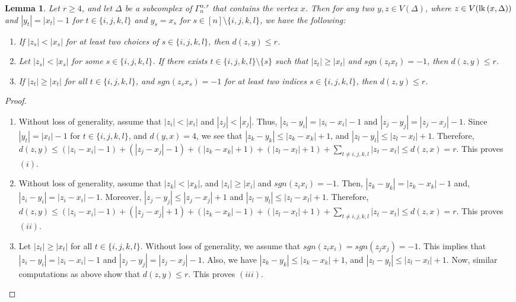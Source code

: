 \documentclass{amsart}
\newtheorem{lemma}[theorem]{Lemma}
\theoremstyle{definition}
\theoremstyle{remark}
\numberwithin{equation}{section}
\newcommand{\lk}{\mbox{\upshape lk}\,}
\newcommand{\D}{\Delta}
\begin{document}
\begin{lemma}\label{fourvertex}
	Let $r\geq 4$, and let  $\D$ be  a subcomplex of $\Gamma_n^{\alpha, r}$ that contains the vertex $x$. Then for any two $y, z \in V(\D)$, where $z\in V(\lk(x,\D))$ and  $|y_t|=|x_t|-1$ for $t\in\{i,j,k,l\}$ and $y_s=x_s$ for $s\in [n]\setminus\{i,j,k,l\}$, we have the following: 
	\begin{enumerate}[label=(\roman*)]
		\item If $|z_s|<|x_s|$ for at least two choices of $s\in\{i,j,k,l\}$,  then $d(z,y)\leq r$. 
		\item Let $|z_s|<|x_s|$ for some $s \in \{i, j, k, l\}$. If there exists $t \in \{i, j, k, l\} \setminus \{s\}$ such that $|z_t|\geq |x_t|$ and $sgn(z_tx_t)=-1$, then $d(z,y)\leq  r$. 
		\item If $|z_t|\geq |x_t|$ for all $t\in\{i,j,k,l\}$, and  $sgn(z_sx_s)=-1$  for at least two indices $s\in\{i,j,k,l\}$, then $d(z,y)\leq r$.
	\end{enumerate}
	
\end{lemma}

\begin{proof} 
	
	\begin{enumerate}[label=(\roman*)]
		\item Without loss of generality, assume that $|z_i|<|x_i|$ and $|z_j|<|x_j|$. Thus,
		$|z_i - y_i| = |z_i - x_i| - 1$ and  $|z_j - y_j| = |z_j - x_j| - 1$. 
		Since $|y_t|=|x_t|-1$ for $t\in\{i,j,k,l\}$, and $d(y,x)=4$, we see that $|z_k-y_k|\leq |z_k-x_k|+1$, and $|z_l-y_l|\leq |z_l-x_l|+1$. Therefore, $d(z,y)\leq (|z_i - x_i| - 1) + (|z_j - x_j| - 1) + (|z_k-x_k|+1)+ (|z_l-x_l|+1)+\sum_{t \neq i,j,k,l} |z_t - x_t| \leq d(z,x)=r$. This proves $(i).$
		
		\item Without loss of generality, assume that $|z_k| < |x_k|$, and $|z_i| \geq |x_i|$ and $sgn(z_ix_i)=-1$. Then, $|z_k - y_k| = |z_k - x_k| - 1$ and, $|z_i - y_i| = |z_i - x_i| - 1$. Moreover, $|z_j - y_j| \leq |z_j - x_j| + 1$ and $|z_l - y_l| \leq |z_l - x_l| + 1$. Therefore, $d(z, y) \leq (|z_i - x_i| - 1) + (|z_j - x_j| + 1) + (|z_k - x_k| - 1) + (|z_l - x_l| + 1) + \sum_{t \neq i,j,k,l} |z_t - x_t| \leq d(z, x) = r.$
		This proves $(ii)$.
		
		\item Let $|z_t| \geq |x_t|$ for all $t \in \{i,j,k,l\}$. Without loss of generality, we assume that $sgn(z_ix_i)=sgn(z_jx_j)=-1$. This implies that $|z_i - y_i| = |z_i - x_i| - 1$ and $|z_j - y_j| = |z_j - x_j| - 1$. Also, we have $|z_k - y_k| \leq |z_k - x_k| + 1$, and $|z_l - y_l| \leq |z_l - x_l| + 1$. Now, similar computations as above show that $d(z, y) \leq r$. This proves $(iii)$.
	\end{enumerate}
    \vspace{- 0.4 cm}
	\end{proof}
\end{document}
